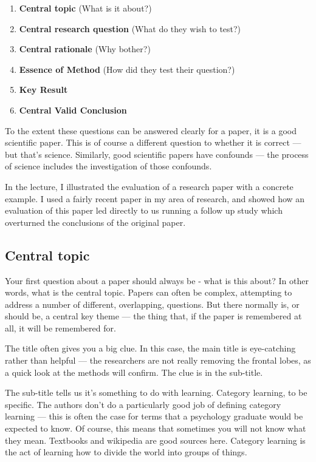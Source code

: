 \documentclass[12pt]{article}
\begin{document}
\begin{enumerate}
	\item \textbf{Central topic} (What is it about?)
	\item \textbf{Central research question} (What do they wish to test?)
	\item \textbf{Central rationale} (Why bother?)
	\item \textbf{Essence of Method} (How did they test their question?)
	\item \textbf{Key Result}
	\item \textbf{Central Valid Conclusion}
\end{enumerate}

To the extent these questions can be answered clearly for a paper, it
is a good scientific paper. This is of course a different question to
whether it is correct --- but that's science. Similarly, good
scientific papers have confounds --- the process of science includes
the investigation of those confounds.

In the lecture, I illustrated the evaluation of a research paper with
a concrete example. I used a fairly recent paper in my area of
research, and showed how an evaluation of this paper led directly to
us running a follow up study which overturned the conclusions of the
original paper. 

\subsection{Central topic}

Your first question about a paper should always be - what is this
about? In other words, what is the central topic. Papers can often be
complex, attempting to address a number of different, overlapping,
questions. But there normally is, or should be, a central key theme
--- the thing that, if the paper is remembered at all, it will be
remembered for.

The title often gives you a big clue.  In this case, the main title is
eye-catching rather than helpful --- the researchers are not really
removing the frontal lobes, as a quick look at the methods will
confirm. The clue is in the sub-title.

The sub-title tells us it's something to do with learning. Category
learning, to be specific. The authors don't do a particularly good job
of defining category learning --- this is often the case for terms
that a psychology graduate would be expected to know.  Of course, this
means that sometimes you will not know what they mean. Textbooks and
wikipedia are good sources here. Category learning is the act of
learning how to divide the world into groups of things.
\end{document}
